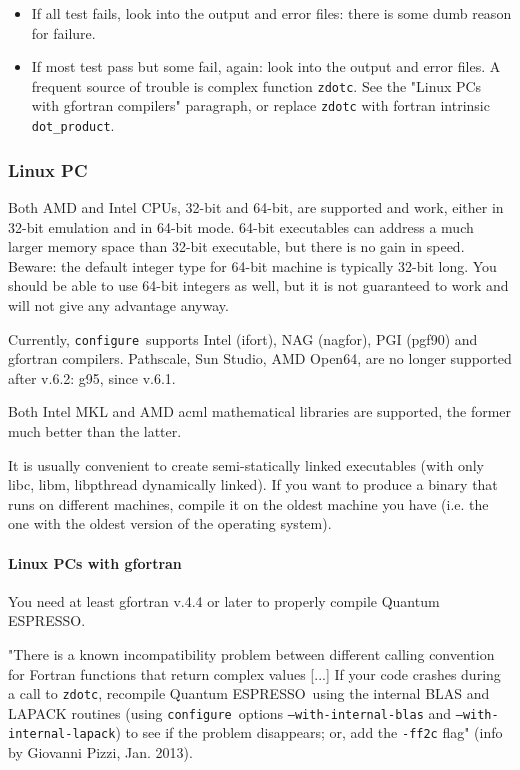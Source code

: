 \documentclass[12pt,a4paper]{article}
\def\qe{{\sc Quantum ESPRESSO}}
\def\configure{\texttt{configure}}
\begin{document}
\begin{itemize}
software incompatibility. Although one can never rule out
the presence of subtle bugs in \qe\ that are not revealed during
the testing phase, it is very unlikely
that this happens on the provided tests and examples.
\item
If all test fails, look into the output and error files:
there is some dumb reason for failure.
\item
If most test pass but some fail, again: look into the output
and error files. A frequent source of trouble is complex function 
\texttt{zdotc}. See the "Linux PCs with gfortran compilers" paragraph, 
or replace \texttt{zdotc} with fortran intrinsic \texttt{dot\_product}.
\end{itemize}


\subsubsection{Linux PC}

Both AMD and Intel CPUs, 32-bit and 64-bit, are supported and work,
either in 32-bit emulation and in 64-bit mode. 64-bit executables
can address a much larger memory space than 32-bit executable, but
there is no gain in speed.
Beware: the default integer type for 64-bit machine is typically
32-bit long. You should be able to use 64-bit integers as well,
but it is not guaranteed to work and will not give
any advantage anyway.

Currently, \configure\ supports Intel (ifort), NAG (nagfor), PGI (pgf90)
and gfortran compilers. Pathscale, Sun Studio, AMD Open64, are no
longer supported after v.6.2: g95, since v.6.1.

Both Intel MKL and AMD acml mathematical libraries are supported, the
former much better than the latter.

It is usually convenient to create semi-statically linked executables (with only
libc, libm, libpthread dynamically linked). If you want to produce a binary
that runs on different machines, compile it on the oldest machine you have
(i.e. the one with the oldest version of the operating system).

\paragraph{Linux PCs with gfortran}

You need at least gfortran v.4.4 or later to properly compile \qe.

"There is a known incompatibility problem between different calling
convention for Fortran functions that return complex values [...]
If your code crashes during a call to \texttt{zdotc},
recompile \qe\ using the internal BLAS and LAPACK routines 
(using \configure\ options \texttt{--with-internal-blas} and
\texttt{--with-internal-lapack})
to see if the problem disappears; or, add the \texttt{-ff2c} flag"
(info by Giovanni Pizzi, Jan. 2013).
\end{document}
